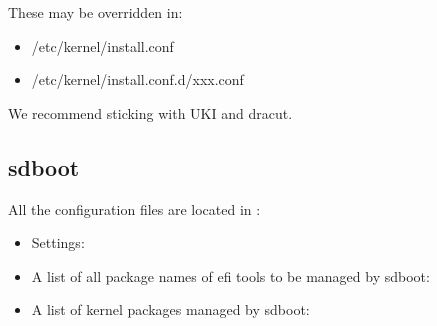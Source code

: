 \documentclass[letterpaper,11pt,english]{sphinxmanual}
\begin{document}
\sphinxAtStartPar
These may be overridden in:
\begin{itemize}
\item {} 
\sphinxAtStartPar
/etc/kernel/install.conf

\item {} 
\sphinxAtStartPar
/etc/kernel/install.conf.d/xxx.conf

\end{itemize}

\sphinxAtStartPar
We recommend sticking with UKI and dracut.


\subsection{sd\sphinxhyphen{}boot}
\label{\detokenize{Readme:id1}}
\sphinxAtStartPar
All the configuration files are located in :
\begin{itemize}
\item {} 
\sphinxAtStartPar
{}

\sphinxAtStartPar
Settings:

\begin{sphinxVerbatim}[commandchars=\\\{\}]
 
 \PYG{p}{[}\PYG{p}{]}
\end{sphinxVerbatim}

\item {} 
\sphinxAtStartPar
{}

\sphinxAtStartPar
A list of all package names of efi tools to be managed by sd\sphinxhyphen{}boot:

\begin{sphinxVerbatim}[commandchars=\\\{\}]
\end{sphinxVerbatim}

\item {} 
\sphinxAtStartPar
{}

\sphinxAtStartPar
A list of kernel packages managed by sd\sphinxhyphen{}boot:

\begin{sphinxVerbatim}[commandchars=\\\{\}]
\end{sphinxVerbatim}

\end{itemize}
\end{document}
